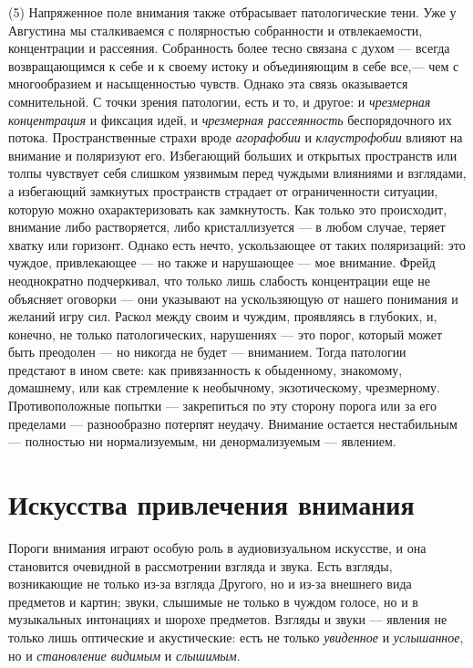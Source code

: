 \documentclass[12pt]{book}
\begin{document}
(5) Напряженное поле внимания также отбрасывает патологические тени. Уже у Августина мы сталкиваемся с полярностью собранности и отвлекаемости, концентрации и рассеяния. Собранность более тесно связана с духом --- всегда возвращающимся к себе и к своему истоку и объединяющим в себе все,--- чем с многообразием и насыщенностью чувств. Однако эта связь оказывается сомнительной. С точки зрения патологии, есть и то, и другое: и \textit{чрезмерная концентрация} и фиксация идей, и \textit{чрезмерная рассеянность} беспорядочного их потока. Пространственные страхи вроде \textit{агорафобии} и \textit{клаустрофобии} влияют на внимание и поляризуют его. Избегающий больших и открытых пространств или толпы чувствует себя слишком уязвимым перед чуждыми влияниями и взглядами, а избегающий замкнутых пространств страдает от ограниченности ситуации, которую можно охарактеризовать как замкнутость. Как только это происходит, внимание либо растворяется, либо кристаллизуется --- в любом случае, теряет хватку или горизонт. Однако есть нечто, ускользающее от таких поляризаций: это чуждое, привлекающее --- но также и нарушающее --- мое внимание. Фрейд неоднократно подчеркивал, что только лишь слабость концентрации еще не объясняет оговорки --- они указывают на ускользяющую от нашего понимания и желаний игру сил. Раскол между своим и чуждим, проявляясь в глубоких, и, конечно, не только патологических, нарушениях --- это порог, который может быть преодолен --- но никогда не будет --- вниманием. Тогда патологии предстают в ином свете: как привязанность к обыденному, знакомому, домашнему, или как стремление к необычному, экзотическому, чрезмерному. Противоположные попытки --- закрепиться по эту сторону порога или за его пределами --- разнообразно потерпят неудачу. Внимание остается нестабильным --- полностью ни нормализуемым, ни денормализуемым --- явлением.

\section{Искусства привлечения внимания}

Пороги внимания играют особую роль в аудиовизуальном искусстве, и она становится очевидной в рассмотрении взгляда и звука. Есть взгляды, возникающие не только из-за взгляда Другого, но и из-за внешнего вида предметов и картин; звуки, слышимые не только в чуждом голосе, но и в музыкальных интонациях и шорохе предметов. Взгляды и звуки --- явления не только лишь оптические и акустические: есть не только \textit{увиденное} и \textit{услышанное}, но и \textit{становление видимым} и \textit{слышимым}.
\end{document}
